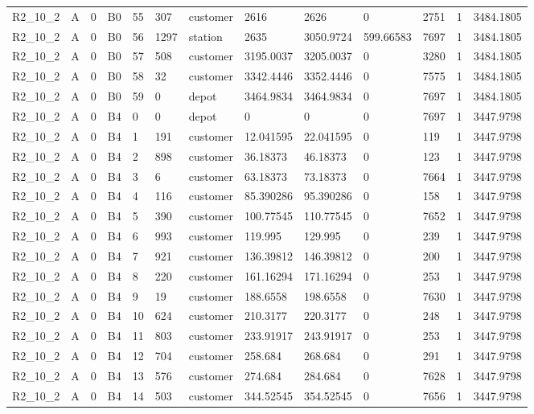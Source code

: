 \begin{longtable}{lllllllllllll}
R2\_10\_2 & A & 0 & B0 & 55 & 307 & customer & 2616 & 2626 & 0 & 2751 & 1 & 3484.1805 \\
R2\_10\_2 & A & 0 & B0 & 56 & 1297 & station & 2635 & 3050.9724 & 599.66583 & 7697 & 1 & 3484.1805 \\
R2\_10\_2 & A & 0 & B0 & 57 & 508 & customer & 3195.0037 & 3205.0037 & 0 & 3280 & 1 & 3484.1805 \\
R2\_10\_2 & A & 0 & B0 & 58 & 32 & customer & 3342.4446 & 3352.4446 & 0 & 7575 & 1 & 3484.1805 \\
R2\_10\_2 & A & 0 & B0 & 59 & 0 & depot & 3464.9834 & 3464.9834 & 0 & 7697 & 1 & 3484.1805 \\
R2\_10\_2 & A & 0 & B4 & 0 & 0 & depot & 0 & 0 & 0 & 7697 & 1 & 3447.9798 \\
R2\_10\_2 & A & 0 & B4 & 1 & 191 & customer & 12.041595 & 22.041595 & 0 & 119 & 1 & 3447.9798 \\
R2\_10\_2 & A & 0 & B4 & 2 & 898 & customer & 36.18373 & 46.18373 & 0 & 123 & 1 & 3447.9798 \\
R2\_10\_2 & A & 0 & B4 & 3 & 6 & customer & 63.18373 & 73.18373 & 0 & 7664 & 1 & 3447.9798 \\
R2\_10\_2 & A & 0 & B4 & 4 & 116 & customer & 85.390286 & 95.390286 & 0 & 158 & 1 & 3447.9798 \\
R2\_10\_2 & A & 0 & B4 & 5 & 390 & customer & 100.77545 & 110.77545 & 0 & 7652 & 1 & 3447.9798 \\
R2\_10\_2 & A & 0 & B4 & 6 & 993 & customer & 119.995 & 129.995 & 0 & 239 & 1 & 3447.9798 \\
R2\_10\_2 & A & 0 & B4 & 7 & 921 & customer & 136.39812 & 146.39812 & 0 & 200 & 1 & 3447.9798 \\
R2\_10\_2 & A & 0 & B4 & 8 & 220 & customer & 161.16294 & 171.16294 & 0 & 253 & 1 & 3447.9798 \\
R2\_10\_2 & A & 0 & B4 & 9 & 19 & customer & 188.6558 & 198.6558 & 0 & 7630 & 1 & 3447.9798 \\
R2\_10\_2 & A & 0 & B4 & 10 & 624 & customer & 210.3177 & 220.3177 & 0 & 248 & 1 & 3447.9798 \\
R2\_10\_2 & A & 0 & B4 & 11 & 803 & customer & 233.91917 & 243.91917 & 0 & 253 & 1 & 3447.9798 \\
R2\_10\_2 & A & 0 & B4 & 12 & 704 & customer & 258.684 & 268.684 & 0 & 291 & 1 & 3447.9798 \\
R2\_10\_2 & A & 0 & B4 & 13 & 576 & customer & 274.684 & 284.684 & 0 & 7628 & 1 & 3447.9798 \\
R2\_10\_2 & A & 0 & B4 & 14 & 503 & customer & 344.52545 & 354.52545 & 0 & 7656 & 1 & 3447.9798 \\

\end{longtable}
